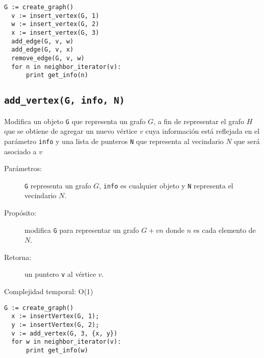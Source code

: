 \documentclass[%
    a4paper,%
    12pt,%
    twoside,%
    openright,%
    halfparskip,%
    cleardoubleempty,%
    bigheadings,%
    titlepage,%
    headsepline%
]{scrbook}
\makeatletter
\newcommand{\Code}[1]{\lstinline[basicstyle={\tt}]@#1@}
\makeatother
\begin{document}
\begin{lstlisting}[caption={Ejemplo de uso de \Code{remove_edge}.  En el código se crea un grafo $G$ con vértices $v$, $w$ y $x$, siendo $v$ adyacente tanto a $w$ como a $x$.  Luego se utiliza \Code{remove_edge} para eliminar la arista $vw$, con lo cual $v$ queda adyacente únicamente a $x$.  El ciclo final, pues, imprime el valor $3$ asociado a $x$.  Ver Sección~\ref{sec:tad grafo:neighbor-iterator} para más información de \Code{neghbor_iterator}.},gobble=2,float=ht,label={lst:pseudo:remove_edge},emph={remove_edge}]
  G := create_graph()
  v := insert_vertex(G, 1)
  w := insert_vertex(G, 2)
  x := insert_vertex(G, 3)
  add_edge(G, v, w)
  add_edge(G, v, x)
  remove_edge(G, v, w)
  for n in neighbor_iterator(v):
      print get_info(n)
\end{lstlisting}


\subsection{\texttt{add\_vertex(G, info, N)}}
\label{sec:tad grafo:add-vertex}

Modifica un objeto \Code{G} que representa un grafo $G$, a fin de representar el grafo $H$ que se obtiene de agregar un nuevo vértice $v$ cuya información está reflejada en el parámetro \Code{info} y una lista de punteros \Code{N} que representa al vecindario $N$ que será asociado a $v$

\begin{description}
  \item [Parámetros:] \Code{G} representa un grafo $G$, \Code{info} es cualquier objeto y \Code{N} representa el vecindario $N$.
  \item [Propósito:] modifica \Code{G} para representar un grafo $G + vn$ donde $n$ es cada elemento de $N$.
  \item [Retorna:] un puntero \Code{v} al vértice $v$.
  \item [Complejidad temporal: O(1)]
\end{description}


\begin{lstlisting}[caption={Ejemplo de uso de \Code{add_vertex}. El código crea un grafo $G$ con tres vertices, teniendo el tercer vertice, llamado $v$, a los otros dos como vecinos. Luego, el ciclo imprime ``12''.},gobble=2,float=ht,label={lst:pseudo:add_vertex},emph={add_vertex}]
  G := create_graph()
  x := insertVertex(G, 1);
  y := insertVertex(G, 2);
  v := add_vertex(G, 3, {x, y})
  for w in neighbor_iterator(v):
      print get_info(w)
\end{lstlisting}
\end{document}
